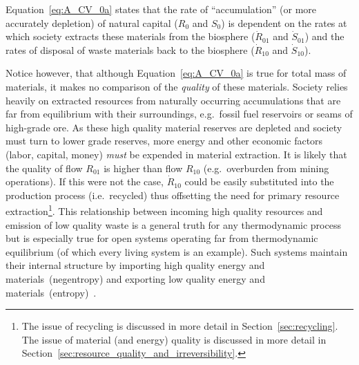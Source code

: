 
Equation~\ref{eq:A_CV_0a} states that the rate of ``accumulation'' 
(or more accurately depletion) of natural capital ($R_{0}$ and $S_{0}$) 
is dependent on the rates at which society extracts these materials
from the biosphere ($\dot{R}_{01}$ and $\dot{S}_{01}$) and the rates
of disposal of waste materials back to the biosphere ($\dot{R}_{10}$ 
and $\dot{S}_{10}$). 

Notice however, that although Equation~\ref{eq:A_CV_0a} is true for total mass of materials,
it makes no comparison of the \emph{quality} of these materials.
Society relies heavily on extracted resources from naturally
occurring accumulations that are far from equilibrium with their surroundings,
e.g.\ fossil fuel reservoirs or seams of high-grade ore. As these high quality
material reserves are depleted and society must turn to lower grade reserves, 
more energy and other economic factors (labor, capital, money) \emph{must} be 
expended  in material extraction.\cite{Mudd2010} It is likely that the quality
of flow $R_{01}$ is higher than flow $R_{10}$ 
(e.g.\ overburden from mining operations). 
If this were not the case,
$\dot{R}_{10}$ could be easily substituted 
into the production process (i.e.\ recycled) thus
offsetting the need for primary resource extraction\footnote{The
issue of recycling is discussed in more detail in 
Section~\ref{sec:recycling}.
The issue of material (and energy) quality 
is discussed in more detail in 
Section~\ref{sec:resource_quality_and_irreversibility}.}. 
This relationship between 
incoming high quality resources and emission of low
quality waste is a general truth 
for any thermodynamic process but is especially
true for open systems operating far from 
thermodynamic equilibrium 
(of which every living system is an example). 
Such systems maintain their internal structure by
importing high quality energy and 
materials~(negentropy) and exporting low quality
energy and materials~(entropy)~\cite{Schroedinger1947}.

